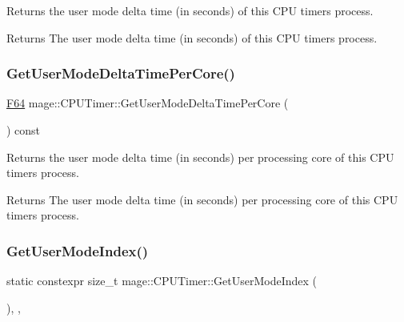 Returns the user mode delta time (in seconds) of this C\+PU timer\textquotesingle{}s process.

\begin{DoxyReturn}{Returns}
The user mode delta time (in seconds) of this C\+PU timer\textquotesingle{}s process. 
\end{DoxyReturn}
\hypertarget{classmage_1_1_c_p_u_timer_a8838f9a875f227c6783e107986c0adfc}{}\label{classmage_1_1_c_p_u_timer_a8838f9a875f227c6783e107986c0adfc} 
\subsubsection{\texorpdfstring{Get\+User\+Mode\+Delta\+Time\+Per\+Core()}{GetUserModeDeltaTimePerCore()}}
{\footnotesize\ttfamily \hyperlink{namespacemage_ad26233bbec640deda836e572c1a23708}{F64} mage\+::\+C\+P\+U\+Timer\+::\+Get\+User\+Mode\+Delta\+Time\+Per\+Core (\begin{DoxyParamCaption}{ }\end{DoxyParamCaption}) const\hspace{0.3cm}{\ttfamily [noexcept]}}

Returns the user mode delta time (in seconds) per processing core of this C\+PU timer\textquotesingle{}s process.

\begin{DoxyReturn}{Returns}
The user mode delta time (in seconds) per processing core of this C\+PU timer\textquotesingle{}s process. 
\end{DoxyReturn}
\hypertarget{classmage_1_1_c_p_u_timer_a457d65db3cb67775971e2750755ad403}{}\label{classmage_1_1_c_p_u_timer_a457d65db3cb67775971e2750755ad403} 
\subsubsection{\texorpdfstring{Get\+User\+Mode\+Index()}{GetUserModeIndex()}}
{\footnotesize\ttfamily static constexpr size\+\_\+t mage\+::\+C\+P\+U\+Timer\+::\+Get\+User\+Mode\+Index (\begin{DoxyParamCaption}{ }\end{DoxyParamCaption})\hspace{0.3cm}{\ttfamily [static]}, {\ttfamily [private]}, {\ttfamily [noexcept]}}

